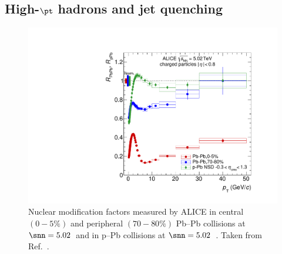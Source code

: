 \subsection{\texorpdfstring{High-\boldmath$\pt$ hadrons and jet quenching}{High-pT hadrons and jet quenching}}\label{sec:high_pt}
\begin{figure}[htb]
  \centering
  \includegraphics[width=0.7\linewidth]{Figures/Chapter 1/rAArpPb.pdf}
  \caption{Nuclear modification factors measured by ALICE in central $(0-5\%)$ and peripheral $(70-80\%)$ Pb--Pb collisions at $\snn=5.02$~\tev and in p--Pb collisions at $\snn = 5.02$~\tev. Taken from Ref.~\cite{ALICE:2018vuu}.}
  \label{fig:RAA}
\end{figure}

